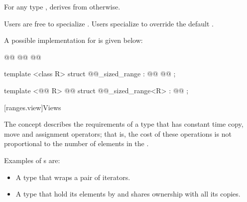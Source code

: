 \begin{addedblock}
\begin{itemdescr}
\pnum
For any type , 
derives from    otherwise.

\pnum
Users are free to specialize .
\enternote Users   specialize
  to override the default  . \exitnote

\pnum
\enternote A possible implementation for
 is given below:

\begin{codeblock}
@\newtxt{// \expos}@
@@
@@

template <class R>
struct @@_sized_range : @@
  @@ { };

template <@@ R>
  @@
struct @@_sized_range<R> : @@ { };
\end{codeblock}
\exitnote
\end{itemdescr}

[ranges.view]{Views}

\pnum
The  concept describes the requirements of a  type that
has constant time copy, move and assignment operators; that is, the cost of
these operations is not proportional to the number of elements in the .

\pnum
\enterexample
Examples of s are:

\begin{itemize}
\item A  type that wraps a pair of iterators.

\item A  type that hold its elements by 
and shares ownership with all its copies.


\end{itemize}
\end{addedblock}
